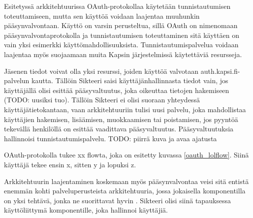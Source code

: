 Esitetyssä arkkitehtuurissa OAuth-protokollaa käytetään tunnistautumisen toteuttamiseen, mutta sen käyttöä voidaan laajentaa muuhunkin pääsynvalvontaan. Käyttö on varsin perusteltua, sillä OAuth on nimenomaan pääsynvalvontaprotokolla ja tunnistautumisen toteuttaminen sitä käyttäen on vain yksi esimerkki käyttömahdollisuuksista. Tunnistautumispalvelua voidaan laajentaa myös suojaamaan muita Kapsin järjestelmissä käytettäviä resursseja.

Jäsenen tiedot voivat olla yksi resurssi, joiden käyttöä valvotaan auth.kapsi.fi-pal\-ve\-lun kautta. Tällöin Sikteeri saisi käyttäjänhallinnasta tiedot vain, jos käyttäjällä olisi esittää pääsyvaltuutus, joka oikeuttaa tietojen hakemiseen (TODO: uusiksi tuo). Tällöin Sikteeri ei olisi suoraan yhteydessä käyttäjätietokantaan, vaan arkkitehtuuriin tulisi uusi palvelu, joka mahdollistaa käyttäjien hakemisen, lisäämisen, muokkaamisen tai poistamisen, jos pyyntöä tekevällä henkilöllä on esittää vaadittava pääsyvaltuutus. Pääsyvaltuutuksia hallinnoisi tunnistautumispalvelu. TODO: piirrä kuva ja avaa ajatusta

OAuth-protokolla tukee xx flowta, joka on esitetty kuvassa \ref{oauth_lolflow}. Siinä käyttäjä tekee ensin x, sitten y ja lopuksi z.

Arkkitehtuurin laajentaminen koskemaan myös pääsynvalvontaa veisi sitä entistä enemmän kohti palveluperusteista arkkitehtuuria, jossa jokaisella komponentilla on yksi tehtävä, jonka ne suorittavat hyvin \cite{soa}. Sikteeri olisi siinä tapauksessa käyttöliittymä komponentille, joka hallinnoi käyttäjiä.